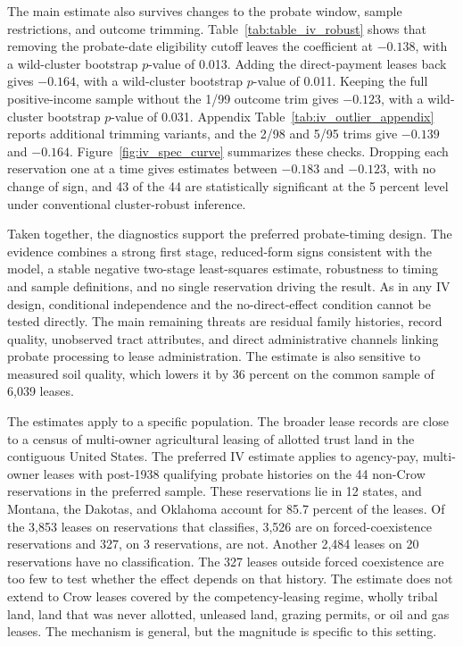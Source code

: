 \documentclass[12pt]{article}
\begin{document}
The main estimate also survives changes to the probate window, sample restrictions, and outcome trimming. Table~\ref{tab:table_iv_robust} shows that removing the probate-date eligibility cutoff leaves the coefficient at $-0.138$, with a wild-cluster bootstrap $p$-value of 0.013. Adding the direct-payment leases back gives $-0.164$, with a wild-cluster bootstrap $p$-value of 0.011. Keeping the full positive-income sample without the 1/99 outcome trim gives $-0.123$, with a wild-cluster bootstrap $p$-value of 0.031. Appendix Table~\ref{tab:iv_outlier_appendix} reports additional trimming variants, and the 2/98 and 5/95 trims give $-0.139$ and $-0.164$. Figure~\ref{fig:iv_spec_curve} summarizes these checks. Dropping each reservation one at a time gives estimates between $-0.183$ and $-0.123$, with no change of sign, and 43 of the 44 are statistically significant at the 5 percent level under conventional cluster-robust inference.

Taken together, the diagnostics support the preferred probate-timing design. The evidence combines a strong first stage, reduced-form signs consistent with the model, a stable negative two-stage least-squares estimate, robustness to timing and sample definitions, and no single reservation driving the result. As in any IV design, conditional independence and the no-direct-effect condition cannot be tested directly. The main remaining threats are residual family histories, record quality, unobserved tract attributes, and direct administrative channels linking probate processing to lease administration. The estimate is also sensitive to measured soil quality, which lowers it by 36 percent on the common sample of 6,039 leases.

The estimates apply to a specific population. The broader lease records are close to a census of multi-owner agricultural leasing of allotted trust land in the contiguous United States. The preferred IV estimate applies to agency-pay, multi-owner leases with post-1938 qualifying probate histories on the 44 non-Crow reservations in the preferred sample. These reservations lie in 12 states, and Montana, the Dakotas, and Oklahoma account for 85.7 percent of the leases. Of the 3,853 leases on reservations that \citet{Dippel2014} classifies, 3,526 are on forced-coexistence reservations and 327, on 3 reservations, are not. Another 2,484 leases on 20 reservations have no classification. The 327 leases outside forced coexistence are too few to test whether the effect depends on that history. The estimate does not extend to Crow leases covered by the competency-leasing regime, wholly tribal land, land that was never allotted, unleased land, grazing permits, or oil and gas leases. The mechanism is general, but the magnitude is specific to this setting.
\end{document}
